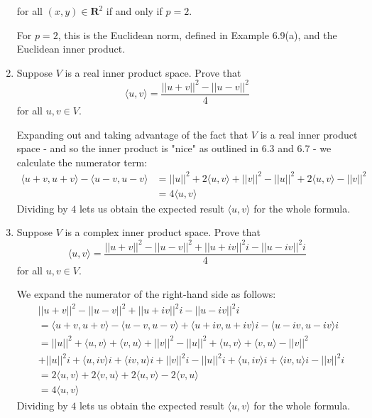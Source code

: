 \documentclass{book}
\begin{document}
\begin{enumerate}
for all \((x,y) \in \textbf{R}^2\) if and only if \(p=2\).

For \(p=2\), this is the Euclidean norm, defined in Example 6.9(a), and the Euclidean inner product.



\item Suppose \(V\) is a real inner product space.  Prove that \[\langle u,v \rangle = \frac{||u+v||^2-||u-v||^2}{4}\] for all \(u,v \in V\).

Expanding out and taking advantage of the fact that \(V\) is a real inner product space - and so the inner product is "nice" as outlined in 6.3 and 6.7 - we calculate the numerator term:
\begin{align*}
\langle u+v,u+v \rangle - \langle u-v,u-v \rangle &= ||u||^2+2\langle u,v \rangle + ||v||^2 - ||u||^2 + 2\langle u,v \rangle - ||v||^2 \\
&=4 \langle u,v \rangle
\end{align*}
Dividing by \(4\) lets us obtain the expected result \(\langle u,v \rangle\) for the whole formula.

\item Suppose \(V\) is a complex inner product space.  Prove that \[\langle u,v \rangle = \frac{||u+v||^2-||u-v||^2+||u+iv||^2i-||u-iv||^2i}{4}\] for all \(u,v \in V\).

We expand the numerator of the right-hand side as follows:
\begin{equation*}
\begin{split}
& ||u+v||^2-||u-v||^2+||u+iv||^2i-||u-iv||^2i \\
&= \langle u+v,u+v \rangle - \langle u-v,u-v \rangle + \langle u+iv,u+iv \rangle i - \langle u-iv,u-iv \rangle i \\
&= ||u||^2+\langle u,v \rangle+\langle v,u \rangle+||v||^2 - ||u||^2 + \langle u,v \rangle + \langle v,u \rangle -||v||^2 \\
&+||u||^2i +\langle u,iv \rangle i + \langle iv,u \rangle i +||v||^2 i - ||u||^2 i + \langle u,iv \rangle i + \langle iv,u \rangle i - ||v||^2 i \\
&= 2\langle u,v \rangle + 2\langle v,u \rangle + 2\langle u,v \rangle - 2\langle v,u \rangle \\
&= 4\langle u,v \rangle
\end{split}
\end{equation*}
Dividing by \(4\) lets us obtain the expected result \(\langle u,v \rangle\) for the whole formula.


\end{enumerate}
\end{document}
